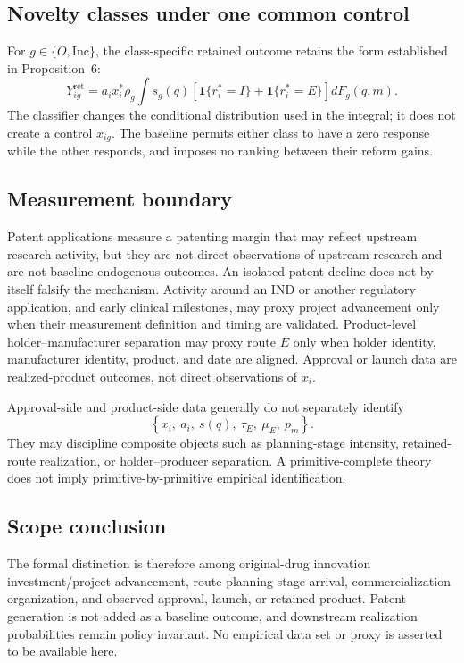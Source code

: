 \subsection{Novelty classes under one common control}
\label{subsec:p09-types}

For \(g\in\{O,\mathrm{Inc}\}\), the class-specific retained outcome retains
the form established in Proposition~6:
\begin{equation}
  Y_{ig}^{\mathrm{ret}}
  =
  a_ix_i^*\rho_g
  \int
  s_g(q)
  \left[
    \mathbf 1\{r_i^*=I\}
    +
    \mathbf 1\{r_i^*=E\}
  \right]
  dF_g(q,m).
  \label{eq:p09-type-mixture}
\end{equation}
The classifier changes the conditional distribution used in the integral; it
does not create a control \(x_{ig}\). The baseline permits either class to
have a zero response while the other responds, and imposes no ranking between
their reform gains.

\subsection{Measurement boundary}
\label{subsec:p09-measurement}

Patent applications measure a patenting margin that may reflect upstream
research activity, but they are not direct observations of upstream research
and are not baseline endogenous outcomes. An isolated patent decline does not
by itself falsify the mechanism.
Activity around an IND or another regulatory application, and early clinical
milestones, may proxy project advancement only when their measurement definition and
timing are validated.
Product-level holder--manufacturer separation may proxy route \(E\) only when
holder identity, manufacturer identity, product, and date are aligned.
Approval or launch data are realized-product outcomes, not direct observations
of \(x_i\).

Approval-side and product-side data generally do not separately identify
\begin{equation}
  \left\{
    x_i,\ a_i,\ s(q),\ \tau_E,\ \mu_E,\ p_m
  \right\}.
  \label{eq:p09-identification-boundary}
\end{equation}
They may discipline composite objects such as planning-stage intensity,
retained-route realization, or holder--producer separation. A
primitive-complete theory does not imply primitive-by-primitive empirical
identification.

\subsection{Scope conclusion}
\label{subsec:p09-scope}

The formal distinction is therefore among original-drug innovation
investment/project advancement, route-planning-stage arrival,
commercialization organization, and observed approval, launch, or retained
product. Patent generation is not added as a baseline outcome, and downstream
realization probabilities remain policy invariant. No empirical data set or
proxy is asserted to be available here.
